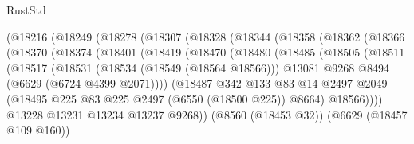 \begin{lexlean}{RustStd}
\begin{coremodule}
                  (@18216
                    (@18249
                      (@18278
                        (@18307
                          (@18328
                            (@18344
                              (@18358
                                (@18362
                                  (@18366
                                    (@18370
                                      (@18374
                                        (@18401
                                          (@18419
                                            (@18470
                                              (@18480
                                                (@18485
                                                  (@18505
                                                    (@18511
                                                      (@18517
                                                        (@18531
                                                          (@18534 (@18549 (@18564 @18566)))
                                                          @13081
                                                          @9268
                                                          @8494
                                                          (@6629 (@6724 @4399 @2071))))
                                                      (@18487
                                                        @342
                                                        @133
                                                        @83
                                                        @14
                                                        @2497
                                                        @2049
                                                        (@18495
                                                          @225
                                                          @83
                                                          @225
                                                          @2497
                                                          (@6550 (@18500 @225))
                                                          @8664)
                                                        @18566))))
                                                @13228
                                                @13231
                                                @13234
                                                @13237
                                                @9268))
                                            (@8560 (@18453 @32))
                                            (@6629 (@18457 @109 @160))

\end{coremodule}
\end{lexlean}
